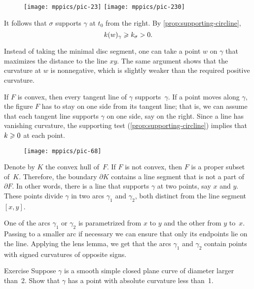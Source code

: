 {

\begin{wrapfigure}{o}{50 mm}
\vskip-4mm
\centering
\texttt{[image: mppics/pic-23]}
\bigskip
\texttt{[image: mppics/pic-230]}
\end{wrapfigure}

It follows that $\sigma$ supports $\gamma$ at $t_0$ from the right.
By \ref{prop:supporting-circline}, 
\[k(w)_\gamma\geqslant k_\sigma >0.\]
\qedsf

Instead of taking the minimal disc segment, one can take a point $w$ on $\gamma$ that maximizes the distance to the line $xy$.
The same argument shows that the curvature at $w$ is nonnegative, which is slightly weaker than the required positive curvature.

}

If $F$ is convex, then every tangent line of $\gamma$ supports~$\gamma$.
If a point moves along $\gamma$, the figure $F$ has to stay on one side from its tangent line;
that is, we can assume that each tangent line supports $\gamma$ on one side, say on the right.
Since a line has vanishing curvature, the supporting test (\ref{prop:supporting-circline}) implies that $k\geqslant 0$ at each point.

\begin{wrapfigure}{r}{35 mm}
\vskip-3mm
\centering
\texttt{[image: mppics/pic-68]}
\vskip0mm
\end{wrapfigure}

Denote by $K$ the convex hull of~$F$.
If $F$ is not convex, then $F$ is a proper subset of~$K$.
Therefore, the boundary $\partial K$ contains a line segment that is not a part of $\partial F$.
In other words, there is a line that supports $\gamma$ at two points, say $x$ and $y$.
These points divide $\gamma$ in two arcs $\gamma_1$ and $\gamma_2$, both distinct from the line segment $[x,y]$.

One of the arcs $\gamma_1$ or $\gamma_2$ is parametrized from $x$ to $y$ and the other from $y$ to~$x$.
Passing to a smaller arc if necessary we can ensure that only its endpoints lie on the line. 
Applying the lens lemma, we get that the arcs $\gamma_1$ and $\gamma_2$ contain points with signed curvatures of opposite signs.
\qeds

\begin{thm}{Exercise}\label{ex:convex small}
Suppose $\gamma$ is a smooth simple closed plane curve of diameter larger than~2.
Show that $\gamma$ has a point with absolute curvature less than~1.
\end{thm}

